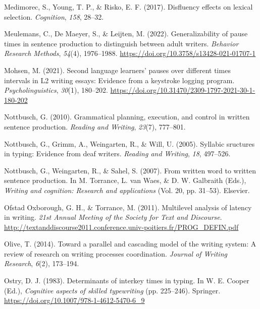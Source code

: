 \documentclass[
  man,floatsintext]{apa7}
\newlength{\cslhangindent}
\newlength{\cslentryspacingunit} %
\newenvironment{CSLReferences}[2] %
 {%
  \setlength{\parindent}{0pt}
  \ifodd #1
  \let\oldpar\par
  \def\par{\hangindent=\cslhangindent\oldpar}
  \fi
  \setlength{\parskip}{#2\cslentryspacingunit}
 }%
 {}
\begin{document}
\begin{CSLReferences}{1}{0}
\leavevmode{}%
Medimorec, S., Young, T. P., \& Risko, E. F. (2017). Disfluency effects on lexical selection. \emph{Cognition}, \emph{158}, 28--32.

\leavevmode{}%
Meulemans, C., De Maeyer, S., \& Leijten, M. (2022). Generalizability of pause times in sentence production to distinguish between adult writers. \emph{Behavior Research Methods}, \emph{54}(4), 1976--1988. \url{https://doi.org/10.3758/s13428-021-01707-1}

\leavevmode{}%
Mohsen, M. (2021). Second language learners' pauses over different times intervals in {L2} writing essays: Evidence from a keystroke logging program. \emph{Psycholinguistics}, \emph{30}(1), 180--202. \url{https://doi.org/10.31470/2309-1797-2021-30-1-180-202}

\leavevmode{}%
Nottbusch, G. (2010). Grammatical planning, execution, and control in written sentence production. \emph{Reading and Writing}, \emph{23}(7), 777--801.

\leavevmode{}%
Nottbusch, G., Grimm, A., Weingarten, R., \& Will, U. (2005). Syllabic sructures in typing: Evidence from deaf writers. \emph{Reading and Writing}, \emph{18}, 497--526.

\leavevmode{}%
Nottbusch, G., Weingarten, R., \& Sahel, S. (2007). From written word to written sentence production. In M. Torrance, L. van Waes, \& D. W. Galbraith (Eds.), \emph{Writing and cognition: Research and applications} (Vol. 20, pp. 31--53). Elsevier.

\leavevmode{}%
Ofstad Oxborough, G. H., \& Torrance, M. (2011). Multilevel analysis of latency in writing. \emph{21st Annual Meeting of the Society for Text and Discourse}. \url{http://textanddiscourse2011.conference.univ-poitiers.fr/PROG_DEFIN.pdf}

\leavevmode{}%
Olive, T. (2014). Toward a parallel and cascading model of the writing system: {A} review of research on writing processes coordination. \emph{Journal of Writing Research}, \emph{6}(2), 173--194.

\leavevmode{}%
Ostry, D. J. (1983). Determinants of interkey times in typing. In W. E. Cooper (Ed.), \emph{Cognitive aspects of skilled typewriting} (pp. 225--246). Springer. \url{https://doi.org/10.1007/978-1-4612-5470-6_9}


\end{CSLReferences}
\end{document}
